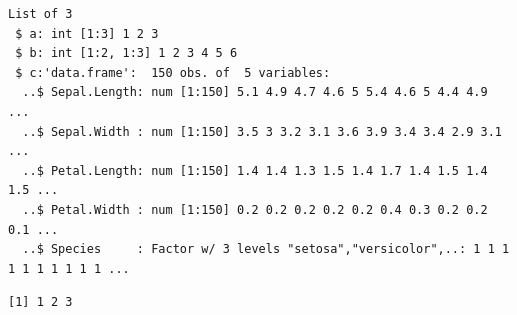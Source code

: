 \documentclass[
  letterpaper,
  DIV=11,
  numbers=noendperiod]{scrreprt}
\newenvironment{Shaded}{\begin{snugshade}}{\end{snugshade}}
\newcommand{\NormalTok}[1]{\textcolor[rgb]{0.00,0.23,0.31}{#1}}
\newcommand{\SpecialCharTok}[1]{\textcolor[rgb]{0.37,0.37,0.37}{#1}}
\begin{document}
\begin{verbatim}
List of 3
 $ a: int [1:3] 1 2 3
 $ b: int [1:2, 1:3] 1 2 3 4 5 6
 $ c:'data.frame':  150 obs. of  5 variables:
  ..$ Sepal.Length: num [1:150] 5.1 4.9 4.7 4.6 5 5.4 4.6 5 4.4 4.9 ...
  ..$ Sepal.Width : num [1:150] 3.5 3 3.2 3.1 3.6 3.9 3.4 3.4 2.9 3.1 ...
  ..$ Petal.Length: num [1:150] 1.4 1.4 1.3 1.5 1.4 1.7 1.4 1.5 1.4 1.5 ...
  ..$ Petal.Width : num [1:150] 0.2 0.2 0.2 0.2 0.2 0.4 0.3 0.2 0.2 0.1 ...
  ..$ Species     : Factor w/ 3 levels "setosa","versicolor",..: 1 1 1 1 1 1 1 1 1 1 ...
\end{verbatim}

\begin{Shaded}
\end{Shaded}

\begin{verbatim}
[1] 1 2 3
\end{verbatim}

\begin{Shaded}
\end{Shaded}
\end{document}
